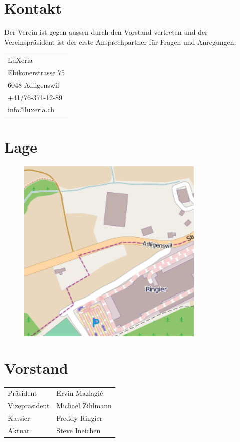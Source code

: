 \documentclass[10pt,foldmark,notumble]{leaflet}
\begin{document}
\newpage

\section{Kontakt}
Der Verein ist gegen aussen durch den Vorstand vertreten
und der Vereinspräsident ist der erste Ansprechpartner
für Fragen und Anregungen.

\begin{table}[h!]
        \begin{tabular}{l}
        LuXeria \\
        Ebikonerstrasse 75 \\
        6048 Adligenswil \\
        +41/76-371-12-89 \\
        info@luxeria.ch 
        \end{tabular}
\end{table}

\section{Lage}
\begin{figure}[h!]
\centering
\includegraphics[width=0.8\textwidth]{lux_lage.png}
\end{figure}

\section{Vorstand}
\begin{table}[h!]
        \begin{tabular}{ll}
        Präsident       & Ervin Mazlagi\'c\\
        Vizepräsident   & Michael Zihlmann\\
        Kassier         & Freddy Ringier\\
        Aktuar          & Steve Ineichen 
        \end{tabular}
\end{table}
\end{document}
